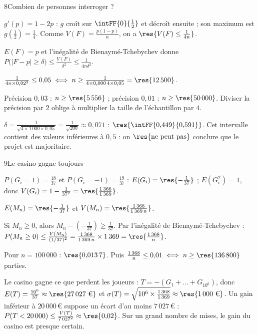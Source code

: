 \begin{corrige}{8}{Combien de personnes interroger ?}
\begin{questions}
  \item $g'(p)=1-2p$ : $g$ croît sur $\intFF{0}{\frac12}$ et décroît ensuite ; son maximum est $g\left(\frac12\right)=\frac14$. Comme
    $V(F)=\frac{p(1-p)}{n}$, on a $\res{V(F)\leq\frac{1}{4n}}$.
  \item $E(F)=p$ et l'inégalité de Bienaymé-Tchebychev donne $P\big(|F-p|\geq\delta\big)\leq\frac{V(F)}{\delta^{2}}\leq\frac{1}{4n\delta^{2}}$.
  \item $\frac{1}{4n\times0{,}02^{2}}\leq0{,}05\iff n\geq\frac{1}{4\times0{,}000\,4\times0{,}05}=\res{12\,500}$.
  \item Précision $0{,}03$ : $n\geq\res{5\,556}$ ; précision $0{,}01$ : $n\geq\res{50\,000}$. Diviser la précision par $2$ oblige à multiplier
    la taille de l'échantillon par $4$.
  \item $\delta=\frac{1}{\sqrt{4\times1\,000\times0{,}05}}=\frac{1}{\sqrt{200}}\approx0{,}071$ : $\res{\intFF{0{,}449}{0{,}591}}$. Cet intervalle contient des
    valeurs inférieures à $0{,}5$ : on $\res{\text{ne peut pas}}$ conclure que le projet est majoritaire.
\end{questions}
\end{corrige}

\begin{corrige}{9}{Le casino gagne toujours}
\begin{questions}
  \item $P(G_i=1)=\frac{18}{37}$ et $P(G_i=-1)=\frac{19}{37}$ : $E(G_i)=\res{-\frac1{37}}$ ; $E\left(G_i^{2}\right)=1$, donc
    $V(G_i)=1-\frac{1}{37^{2}}=\res{\frac{1\,368}{1\,369}}$.
  \item $E(M_n)=\res{-\frac1{37}}$ et $V(M_n)=\res{\frac{1\,368}{1\,369\,n}}$.
  \item Si $M_n\geq0$, alors $M_n-\left(-\frac1{37}\right)\geq\frac1{37}$. Par l'inégalité de Bienaymé-Tchebychev :
    $P(M_n\geq0)\leq\frac{V(M_n)}{(1/37)^{2}}=\frac{1\,368}{1\,369\,n}\times1\,369=\res{\frac{1\,368}{n}}$.
  \item Pour $n=100\,000$ : $\res{0{,}013\,7}$. Puis $\frac{1\,368}{n}\leq0{,}01\iff n\geq\res{136\,800}$ parties.
  \item Le casino gagne ce que perdent les joueurs : $T=-(G_1+\dots+G_{10^{6}})$, donc $E(T)=\frac{10^{6}}{37}\approx\res{27\,027\text{ €}}$ et
    $\sigma(T)=\sqrt{10^{6}\times\frac{1\,368}{1\,369}}\approx\res{1\,000\text{ €}}$. Un gain inférieur à $20\,000$\,€ suppose un écart d'au moins
    $7\,027$\,€ : $P(T<20\,000)\leq\frac{V(T)}{7\,027^{2}}\approx\res{0{,}02}$. Sur un grand nombre de mises, le gain du casino est presque certain.
\end{questions}
\end{corrige}
